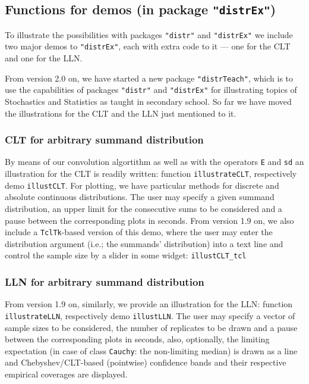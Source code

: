 \documentclass[11pt]{article}
\newcommand{\code}[1]{{\tt #1}}
\newcommand{\pkg}[1]{{\tt "#1"}}
\begin{document}
\subsection[Functions for demos (in package distrEx)]{Functions for demos 
(in package \pkg{distrEx})}\label{Demos}
%
To illustrate the possibilities with packages \pkg{distr} and \pkg{distrEx} we 
include two major demos to \pkg{distrEx}, each with extra code to it ---
one for the CLT and one for the LLN.

From version 2.0 on, we have started a new package \pkg{distrTeach}, which
is to use the capabilities of packages \pkg{distr} and \pkg{distrEx} for
illustrating topics of Stochastics and Statistics as taught in secondary
school. So far we have moved the illustrations for the CLT and the LLN 
just mentioned to it.

\subsubsection{CLT for arbitrary summand distribution}

By means of our convolution algortithm as well as with the operators \code{E} 
and \code{sd} an illustration for the CLT is readily written: 
function \code{illustrateCLT}, respectively demo \code{illustCLT}.
For plotting, we have particular methods for discrete and absolute continuous 
distributions. The user may specify a given summand distribution, an upper 
limit for the consecutive sums to be considered and a pause between the 
corresponding plots in seconds. From version 1.9 on, we also include a 
\code{TclTk}-based version of this demo, where the user may enter the 
distribution argument (i.e.; the summands' distribution) into a text line and 
control the sample size by a slider in some widget: \code{illustCLT\_tcl}

\subsubsection{LLN for arbitrary summand distribution}

From version 1.9 on, similarly, we provide an illustration for the LLN:
function \code{illustrateLLN}, respectively demo \code{illustLLN}.
The user may specify a vector of sample sizes to be 
considered, the number of replicates to be drawn and a pause between the 
corresponding plots in seconds, also, optionally, the limiting expectation
(in case of class \code{Cauchy}: the non-limiting median) is drawn as a line and
Chebyshev/CLT-based (pointwise) confidence bands and their respective empirical 
coverages are displayed. 
\end{document}
